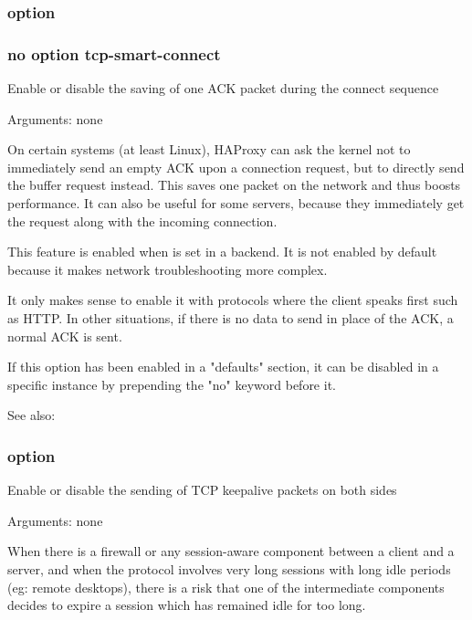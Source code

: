 {\subsubsection[tcp-smart-accept]{option }
\subsubsection*{no option tcp-smart-connect}


  Enable or disable the saving of one ACK packet during the connect sequence


  Arguments: none

  On certain systems (at least Linux), HAProxy can ask the kernel not to
  immediately send an empty ACK upon a connection request, but to directly
  send the buffer request instead. This saves one packet on the network and
  thus boosts performance. It can also be useful for some servers, because they
  immediately get the request along with the incoming connection.

  This feature is enabled when  is set in a backend.
  It is not enabled by default because it makes network troubleshooting more
  complex.

  It only makes sense to enable it with protocols where the client speaks first
  such as HTTP. In other situations, if there is no data to send in place of
  the ACK, a normal ACK is sent.

  If this option has been enabled in a "defaults" section, it can be disabled
  in a specific instance by prepending the "no" keyword before it.

  See also: 

\subsubsection[tcpka]{option }

  Enable or disable the sending of TCP keepalive packets on both sides


  Arguments: none

  When there is a firewall or any session-aware component between a client and
  a server, and when the protocol involves very long sessions with long idle
  periods (eg: remote desktops), there is a risk that one of the intermediate
  components decides to expire a session which has remained idle for too long.

}

